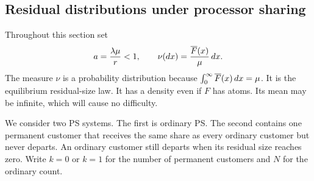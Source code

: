 \subsection{Residual distributions under processor sharing}\label{sec:ps-stationary}
Throughout this section set
\begin{equation}\label{eq:slow-load}
 a=\frac{\lambda\mu}{r}<1,
 \qquad
 \nu(dx)=\frac{\overline F(x)}{\mu}\,dx.
\end{equation}
The measure $\nu$ is a probability distribution because $\int_0^\infty\overline F(x)\,dx=\mu$. It is the equilibrium residual-size law. It has a density even if $F$ has atoms. Its mean may be infinite, which will cause no difficulty.

We consider two PS systems. The first is ordinary PS. The second contains one permanent customer that receives the same share as every ordinary customer but never departs. An ordinary customer still departs when its residual size reaches zero. Write $k=0$ or $k=1$ for the number of permanent customers and $N$ for the ordinary count.


